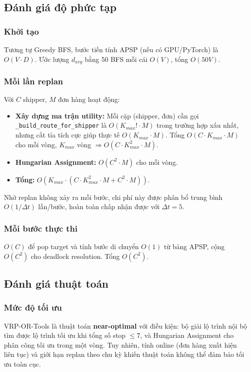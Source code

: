 \documentclass[conference]{IEEEtran}
\begin{document}
\subsection{Đánh giá độ phức tạp}
 
\subsubsection{Khởi tạo}
Tương tự Greedy BFS, bước tiền tính APSP (nếu có GPU/PyTorch) là $O(V \cdot D)$. Ước lượng $d_{avg}$ bằng 50 BFS mỗi cái $O(V)$, tổng $O(50V)$.
 
\subsubsection{Mỗi lần replan}
Với $C$ shipper, $M$ đơn hàng hoạt động:
\begin{itemize}
    \item \textbf{Xây dựng ma trận utility:} Mỗi cặp (shipper, đơn) cần gọi \texttt{\_build\_route\_for\_shipper} là $O(K_{max}! \cdot M)$ trong trường hợp xấu nhất, nhưng cắt tỉa tích cực giúp thực tế $O(K_{max} \cdot M)$. Tổng $O(C \cdot K_{max} \cdot M)$ cho mỗi vòng, $K_{max}$ vòng $\Rightarrow O(C \cdot K_{max}^2 \cdot M)$.
    \item \textbf{Hungarian Assignment:} $O(C^2 \cdot M)$ cho mỗi vòng.
    \item \textbf{Tổng:} $O(K_{max} \cdot (C \cdot K_{max}^2 \cdot M + C^2 \cdot M))$.
\end{itemize}
Nhờ replan không xảy ra mỗi bước, chi phí này được phân bổ trung bình $O(1/\Delta t)$ lần/bước, hoàn toàn chấp nhận được với $\Delta t = 5$.
 
\subsubsection{Mỗi bước thực thi}
$O(C)$ để pop target và tính bước di chuyển $O(1)$ từ bảng APSP, cộng $O(C^2)$ cho deadlock resolution. Tổng $O(C^2)$.
 
\subsection{Đánh giá thuật toán}
 
\subsubsection{Mức độ tối ưu}
VRP-OR-Tools là thuật toán \textbf{near-optimal} với điều kiện: bộ giải lộ trình nội bộ tìm được lộ trình tối ưu khi tổng số stop $\le 7$, và Hungarian Assignment cho phân công tối ưu trong một vòng. Tuy nhiên, tính online (đơn hàng xuất hiện liên tục) và giới hạn replan theo chu kỳ khiến thuật toán không thể đảm bảo tối ưu toàn cục.
 
\end{document}
